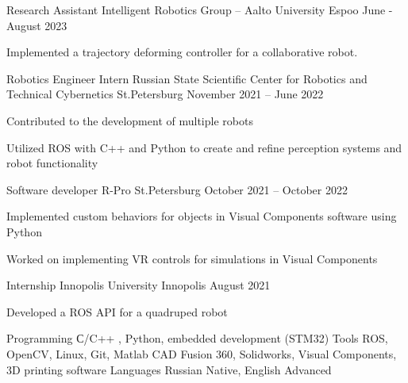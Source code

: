 \documentclass[]{awesome-cv}
\begin{document}
\vspace{-2mm}
\begin{cventries}
	\cventry
	{Research Assistant}
	{Intelligent Robotics Group – Aalto University}
	{Espoo}
	{June - August 2023}
	{\begin{cvitems}
		\item {Implemented a trajectory deforming controller for a collaborative robot. }
	\end{cvitems}
	}

	\cventry
	{Robotics Engineer Intern}
	{Russian State Scientific Center for Robotics and Technical Cybernetics}
	{St.Petersburg}
	{November 2021 – June 2022}
	{\begin{cvitems}
		\item {Contributed to the development of multiple robots}
		\item {Utilized ROS with C++ and Python to create and refine perception systems and robot functionality}
	\end{cvitems}
	}

	\cventry
	{Software developer}
	{R-Pro}
	{St.Petersburg}
	{October 2021 – October 2022}
	{
	\begin{cvitems}
		\item {Implemented custom behaviors for objects in Visual Components software using Python}
		\item {Worked on implementing VR controls for simulations in Visual Components }
	\end{cvitems}
	}

	\cventry
	{Internship}
	{Innopolis University}
	{Innopolis}
	{August 2021}
	{\begin{cvitems}
		\item {Developed a ROS API for a quadruped robot}
	\end{cvitems}}
\end{cventries}

	\begin{cvskills}
		\cvskill
		{Programming} %
		{С/C++ , Python, embedded development (STM32)} %
		\cvskill
		{Tools} 
		{ROS, OpenCV, Linux, Git, Matlab} 
		\cvskill
		{CAD} 
		{Fusion 360, Solidworks, Visual Components, 3D printing software} %
		\cvskill
		{Languages} %
		{Russian Native, English Advanced} %
	\end{cvskills}
\end{document}
